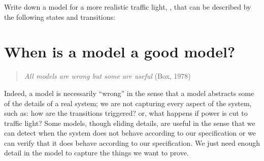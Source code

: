 \begin{exc}
Write down a model for a more realistic traffic light, \ie{}, that can
be described by the following states and transitions:
%
\begin{center}
\end{center}
\end{exc}

\section{When is a model a good model?}
\label{subsec:whenisamodelgood}

\begin{quote}
\emph{All models are wrong but some are useful} (Box, 1978)
\end{quote}

\noindent
Indeed, a model is necessarily ``wrong'' in the sense that a model
abstracts some of the details of a real system; we are not
capturing every aspect of the system, such as: how are the transitions
triggered? or, what happens if power is cut to traffic light? Some
models, though eliding details, are useful in the sense that we
can detect when the system does not behave according to our
specification or we can verify that it does behave according to our
specification. We just need enough detail in the model to capture the
things we want to prove.

